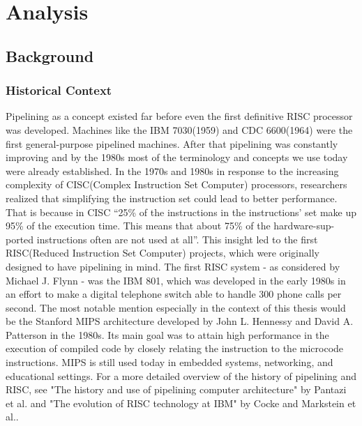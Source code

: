 \chapter{Analysis}

\section{Background}
\subsection{Historical Context}
Pipelining as a concept existed far before even the first definitive RISC processor was developed. Machines like the IBM 7030(1959) and CDC 6600(1964) were the first general-purpose pipelined machines. After that pipelining was constantly improving and by the 1980s most of the terminology and concepts we use today were already established\cite{pantazi2013history}. In the 1970s and 1980s in response to the increasing complexity of CISC(Complex Instruction Set Computer) processors, researchers realized that simplifying the instruction set could lead to better performance. That is because in CISC \enquote{25\% of the instructions in the instructions' set make up 95\% of the execution time. This means that about 75\% of the hardware-sup-ported instructions often are not used at all}\cite{jamil1995risc}. This insight led to the first RISC(Reduced Instruction Set Computer) projects\cite{aletan1992overview}, which were originally designed to have pipelining in mind\cite{pantazi2013history}. The first RISC system - as considered by Michael J. Flynn - was the IBM 801\cite{flynn1995computer}, which was developed in the early 1980s in an effort to make a digital telephone switch able to handle 300 phone calls per second\cite{cocke1990evolution}. The most notable mention especially  in the context of this thesis would be the Stanford MIPS architecture developed by John L. Hennessy and David A. Patterson in the 1980s. Its main goal was to attain high performance in the execution of compiled code by closely relating the instruction to the microcode instructions\cite{hennessy1982mips}. MIPS is still used today in embedded systems, networking, and educational settings. For a more detailed overview of the history of pipelining and RISC, see "The history and use of pipelining computer architecture" by Pantazi et al.\cite{pantazi2013history} and "The evolution of RISC technology at IBM" by Cocke and Markstein et al.\cite{cocke1990evolution}.
